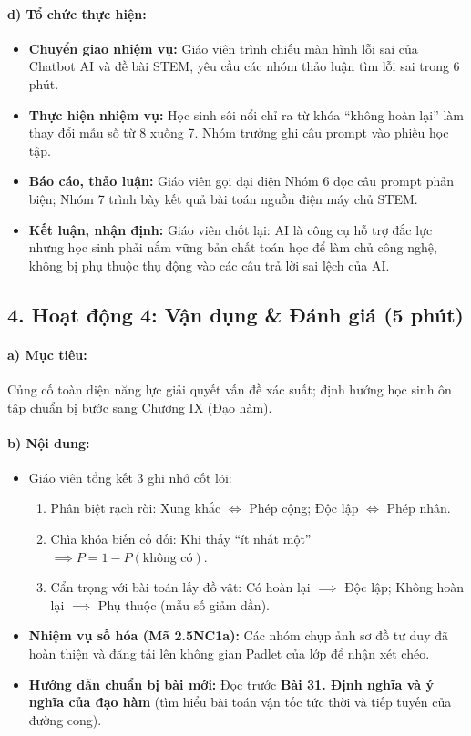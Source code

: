 \documentclass[12pt, a4paper]{article}
\begin{document}
\paragraph{d) Tổ chức thực hiện:}
\begin{itemize}[leftmargin=0.8cm]
    \item \textbf{Chuyển giao nhiệm vụ:} Giáo viên trình chiếu màn hình lỗi sai của Chatbot AI và đề bài STEM, yêu cầu các nhóm thảo luận tìm lỗi sai trong 6 phút.
    \item \textbf{Thực hiện nhiệm vụ:} Học sinh sôi nổi chỉ ra từ khóa ``không hoàn lại'' làm thay đổi mẫu số từ 8 xuống 7. Nhóm trưởng ghi câu prompt vào phiếu học tập.
    \item \textbf{Báo cáo, thảo luận:} Giáo viên gọi đại diện Nhóm 6 đọc câu prompt phản biện; Nhóm 7 trình bày kết quả bài toán nguồn điện máy chủ STEM.
    \item \textbf{Kết luận, nhận định:} Giáo viên chốt lại: AI là công cụ hỗ trợ đắc lực nhưng học sinh phải nắm vững bản chất toán học để làm chủ công nghệ, không bị phụ thuộc thụ động vào các câu trả lời sai lệch của AI.
\end{itemize}

\subsection*{4. Hoạt động 4: Vận dụng \& Đánh giá (5 phút)}

\paragraph{a) Mục tiêu:} Củng cố toàn diện năng lực giải quyết vấn đề xác suất; định hướng học sinh ôn tập chuẩn bị bước sang Chương IX (Đạo hàm).

\paragraph{b) Nội dung:}
\begin{itemize}[leftmargin=0.6cm]
    \item Giáo viên tổng kết 3 ghi nhớ cốt lõi:
    \begin{enumerate}[leftmargin=0.5cm]
        \item Phân biệt rạch ròi: Xung khắc $\iff$ Phép cộng; Độc lập $\iff$ Phép nhân.
        \item Chìa khóa biến cố đối: Khi thấy ``ít nhất một'' $\implies P = 1 - P(\text{không có})$.
        \item Cẩn trọng với bài toán lấy đồ vật: Có hoàn lại $\implies$ Độc lập; Không hoàn lại $\implies$ Phụ thuộc (mẫu số giảm dần).
    \end{enumerate}
    \item \textbf{Nhiệm vụ số hóa (Mã 2.5NC1a):} Các nhóm chụp ảnh sơ đồ tư duy đã hoàn thiện và đăng tải lên không gian Padlet của lớp để nhận xét chéo.
    \item \textbf{Hướng dẫn chuẩn bị bài mới:} Đọc trước \textbf{Bài 31. Định nghĩa và ý nghĩa của đạo hàm} (tìm hiểu bài toán vận tốc tức thời và tiếp tuyến của đường cong).
\end{itemize}
\end{document}
